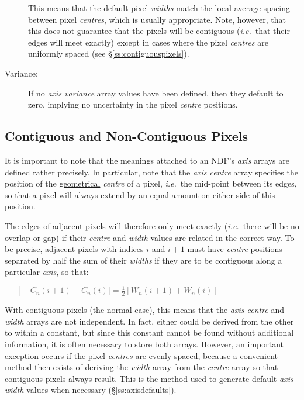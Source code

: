 \documentclass[twoside,11pt]{article}
\newcommand{\xlabel}[1]{}
\newcommand{\st}[1]{{\em{#1}}}
\begin{document}
\begin{description}
This means that the default pixel \st{widths\/} match the local average
spacing between pixel \st{centres\/}, which is usually appropriate. 
Note, however, that this does not guarantee that the pixels will be
contiguous (\st{i.e.}\ that their edges will meet exactly) except in cases
where the pixel \st{centres\/} are uniformly spaced (see
\S\ref{ss:contiguouspixels}). 

\item[Variance:]
If no \st{axis variance\/} array values have been defined, then they
default to zero, implying no uncertainty in the pixel \st{centre\/}
positions. 

\end{description}

\subsection{\xlabel{contiguous_and_non-contiguous_pixels}\label{ss:contiguouspixels}Contiguous and Non-Contiguous Pixels}

It is important to note that the meanings attached to an NDF's \st{axis\/}
arrays are defined rather precisely. 
In particular, note that the \st{axis centre\/} array specifies the
position of the \underline{geometrical} \st{centre\/} of a pixel,
\st{i.e.}\ the mid-point between its edges, so that a pixel will
always extend 
by an equal amount on either side of this position. 

The edges of adjacent pixels will therefore only meet exactly
(\st{i.e.}\ there will be no overlap or gap) if their \st{centre\/}
and \st{width\/} values are related in the correct way. 
To be precise, adjacent pixels with indices $i$ and $i+1$ must have
\st{centre\/} positions separated by half the sum of their \st{widths\/} if 
they are to be contiguous along a particular \st{axis}, so that: 

\small
\begin{quote}
\begin{center}
$|C_{n}(i+1) - C_{n}(i)| = \frac{1}{2} [W_{n}(i+1) + W_{n}(i)]$
\end{center}
\end{quote}
\normalsize

With contiguous pixels (the normal case), this means that the \st{axis 
centre\/} and \st{width\/} arrays are not independent.
In fact, either could be derived from the other to within a constant,
but since this constant cannot be found without additional information,
it is often necessary to store both arrays. 
However, an important exception occurs if the pixel \st{centres\/} are
evenly spaced, because a convenient method then exists of deriving the
\st{width\/} array from the \st{centre\/} array so that contiguous
pixels 
always result.
This is the method used to generate default \st{axis width\/} values when
necessary (\S\ref{ss:axisdefaults}). 
\end{document}
